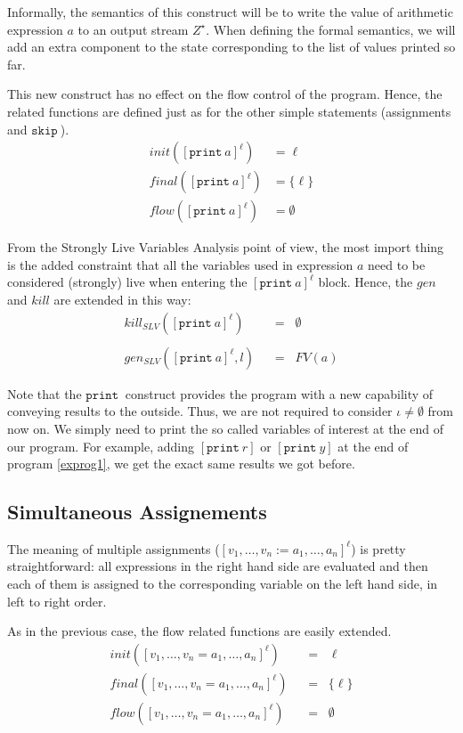 \documentclass[a4wide,12pt]{article}
\def\eq{\;\; = \;\;}
\def\skip {\texttt{skip}\ }
\def\print{\texttt{print}\ }
\def\program#1{\fbox{\begin{minipage}{0.5\textwidth}\protect{$\begin{array}{ll} #1 \end{array}$}\end{minipage}}}
\begin{document}
Informally, the semantics of this construct will be to write the value of arithmetic expression $a$ to an output
stream $Z^\star$. When defining the formal semantics, we will add an extra component to the state corresponding to the
list of values printed so far.
 
This new construct has no effect on the flow control of the program. Hence, the related functions are
defined just as for the other simple statements (assignments and $\skip$).
\begin{align*}
init([\print a]^\ell) & = \ell \\
final([\print a]^\ell) & = \{\ell\} \\
flow([\print a]^\ell) & = \emptyset
\end{align*}
 
From the Strongly Live Variables Analysis point of view, the most import thing is
the added constraint that all the variables used in expression $a$ need to be
considered (strongly) live when entering the $[\print a]^\ell$ block. Hence, the $gen$ and $kill$ are extended in this way:
\begin{align*}
kill_{SLV}([\print a]^\ell) & \eq \emptyset \\
\\
gen_{SLV}([\print a]^\ell,l) & \eq FV(a)
\end{align*}
 
Note that the $\print$ construct provides the program with a new capability of conveying
results to the outside. Thus, we are not required to consider $\iota \neq \emptyset$ from now on.
We simply need to print the so called variables of interest at the end of our program.
For example, adding $[\print r]$ or $[\print y]$ at the end of program \ref{exprog1},
we get the exact same results we got before.
 
\program{}
 
\subsection{Simultaneous Assignements}
 
The meaning of multiple assignments ($[v_1,\ldots,v_n := a_1,\ldots,a_n]^\ell$) is
pretty straightforward: all expressions in the right hand side are evaluated and
then each of them is assigned to the corresponding variable on the left hand side, in left to right order.
 
As in the previous case, the flow related functions are easily extended.
\begin{align*}
init ([v_1,\ldots,v_n = a_1,\ldots,a_n]^\ell) & \eq \ell \\
final([v_1,\ldots,v_n = a_1,\ldots,a_n]^\ell) & \eq \{\ell\} \\
flow ([v_1,\ldots,v_n = a_1,\ldots,a_n]^\ell) & \eq \emptyset
\end{align*}
 
\end{document}
